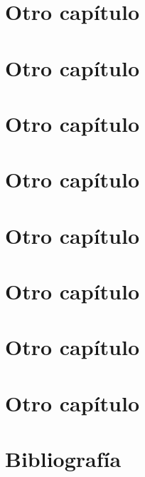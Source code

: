 \documentclass[a4paper,11pt]{memoir}
\begin{document}
\chapter{Otro capítulo}
\chapter{Otro capítulo}
\chapter{Otro capítulo}
\chapter{Otro capítulo}
\chapter{Otro capítulo}
\chapter{Otro capítulo}

\appendix

\chapter{Otro capítulo}
\chapter{Otro capítulo}

\backmatter

\chapter*{Bibliografía}
\end{document}

